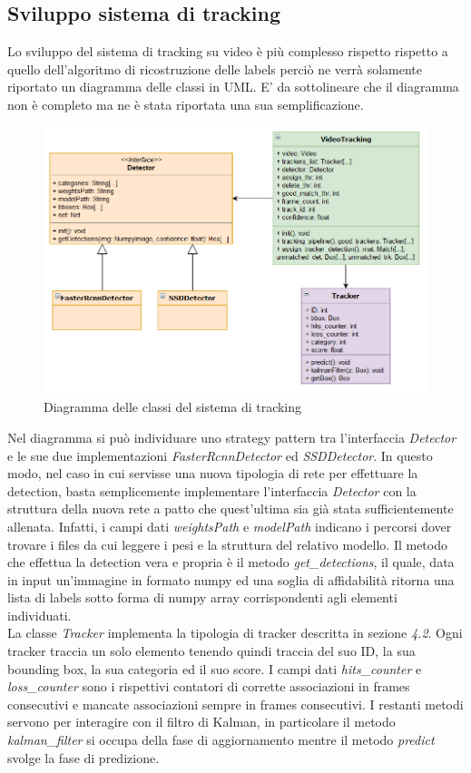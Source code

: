 \newpage
\subsection{Sviluppo sistema di tracking}
Lo sviluppo del sistema di tracking su video è più complesso rispetto rispetto a quello dell'algoritmo di ricostruzione delle labels perciò ne verrà solamente riportato un diagramma delle classi in UML. E' da sottolineare che il diagramma non è completo ma ne è stata riportata una sua semplificazione.
\begin{figure}[H]
	\centering
	\includegraphics[width=0.9\linewidth]{images/diagramma-classi-tracking.png}
	\caption{Diagramma delle classi del sistema di tracking}
	\label{Diagramma delle classi del sistema di tracking}
\end{figure}
Nel diagramma si può individuare uno strategy pattern tra l'interfaccia \textit{Detector} e le sue due implementazioni \textit{FasterRcnnDetector} ed \textit{SSDDetector}. In questo modo, nel caso in cui servisse una nuova tipologia di rete per effettuare la detection, basta semplicemente implementare l'interfaccia \textit{Detector} con la struttura della nuova rete a patto che quest'ultima sia già stata sufficientemente allenata. Infatti, i campi dati \textit{weightsPath} e \textit{modelPath} indicano i percorsi dover trovare i files da cui leggere i pesi e la struttura del relativo modello. Il metodo che effettua la detection vera e propria è il metodo \textit{get\_detections}, il quale, data in input un'immagine in formato numpy ed una soglia di affidabilità ritorna una lista di labels sotto forma di numpy array corrispondenti agli elementi individuati.\\
La classe \textit{Tracker} implementa la tipologia di tracker descritta in sezione \textit{4.2}. Ogni tracker traccia un solo elemento tenendo quindi traccia del suo ID, la sua bounding box, la sua categoria ed il suo score. I campi dati \textit{hits\_counter} e \textit{loss\_counter} sono i rispettivi contatori di corrette associazioni in frames consecutivi e mancate associazioni sempre in frames consecutivi. I restanti metodi servono per interagire con il filtro di Kalman, in particolare il metodo \textit{kalman\_filter} si occupa della fase di aggiornamento mentre il metodo \textit{predict} svolge la fase di predizione.\\
